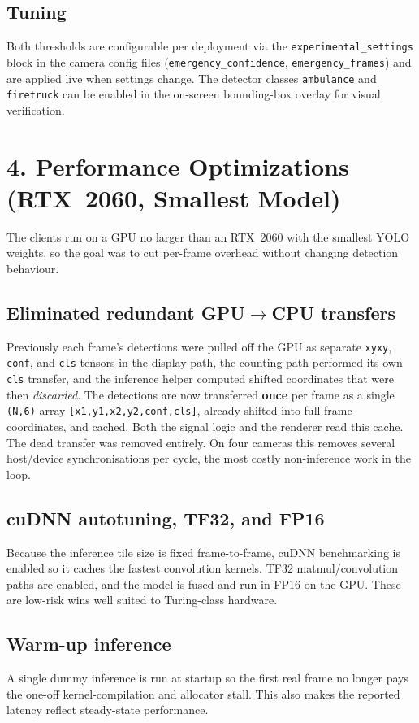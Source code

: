 \documentclass[11pt]{article}
\begin{document}
\subsection{Tuning}
Both thresholds are configurable per deployment via the
\texttt{experimental\_settings} block in the camera config files
(\texttt{emergency\_confidence}, \texttt{emergency\_frames}) and are applied
live when settings change. The detector classes \texttt{ambulance} and
\texttt{firetruck} can be enabled in the on-screen bounding-box overlay for
visual verification.

\section{4. Performance Optimizations (RTX~2060, Smallest Model)}
The clients run on a GPU no larger than an RTX~2060 with the smallest YOLO
weights, so the goal was to cut per-frame overhead without changing detection
behaviour.

\subsection{Eliminated redundant GPU$\rightarrow$CPU transfers}
Previously each frame's detections were pulled off the GPU as separate
\texttt{xyxy}, \texttt{conf}, and \texttt{cls} tensors in the display path, the
counting path performed its own \texttt{cls} transfer, and the inference helper
computed shifted coordinates that were then \emph{discarded}. The detections
are now transferred \textbf{once} per frame as a single
\texttt{(N,6)} array \texttt{[x1,y1,x2,y2,conf,cls]}, already shifted into
full-frame coordinates, and cached. Both the signal logic and the renderer read
this cache. The dead transfer was removed entirely. On four cameras this
removes several host/device synchronisations per cycle, the most costly
non-inference work in the loop.

\subsection{cuDNN autotuning, TF32, and FP16}
Because the inference tile size is fixed frame-to-frame, cuDNN benchmarking is
enabled so it caches the fastest convolution kernels. TF32 matmul/convolution
paths are enabled, and the model is fused and run in FP16 on the GPU. These are
low-risk wins well suited to Turing-class hardware.

\subsection{Warm-up inference}
A single dummy inference is run at startup so the first real frame no longer
pays the one-off kernel-compilation and allocator stall. This also makes the
reported latency reflect steady-state performance.
\end{document}
